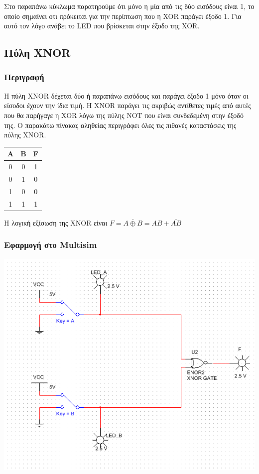 \documentclass{article}
\begin{document}
Στο παραπάνω κύκλωμα παρατηρούμε ότι μόνο η μία από τις δύο εισόδους είναι 1, το οποίο
σημαίνει οτι πρόκειται για την περίπτωση που η XOR παράγει έξοδο 1. Για αυτό τον λόγο
ανάβει το LED που βρίσκεται στην έξοδο της XOR.

\subsection{Πύλη XNOR}
\subsubsection{Περιγραφή}

Η πύλη XNOR δέχεται δύο ή παραπάνω εισόδους και παράγει έξοδο 1 μόνο όταν οι είσοδοι
έχουν την ίδια τιμή. Η XNOR παράγει τις ακριβώς αντίθετες τιμές από αυτές που θα
παρήγαγε η XOR λόγω της πύλης NOT που είναι συνδεδεμένη στην έξοδό της. Ο παρακάτω
πίνακας αληθείας περιγράφει όλες τις πιθανές καταστάσεις της πύλης XNOR. 

\begin{center}
\begin{tabular}{|c|c|c|}
	\hline
	A & B & F \\
	\hline
	0 & 0 & 1 \\
	0 & 1 & 0 \\
	1 & 0 & 0 \\
	1 & 1 & 1 \\
	\hline
\end{tabular}
\end{center}

Η λογική εξίσωση της XNOR είναι $F = \overline{A \oplus B} = AB + \overline{AB}$

\subsubsection{Εφαρμογή στο Multisim}
\includegraphics[width=\textwidth]{./res/xnor.png}
\end{document}
